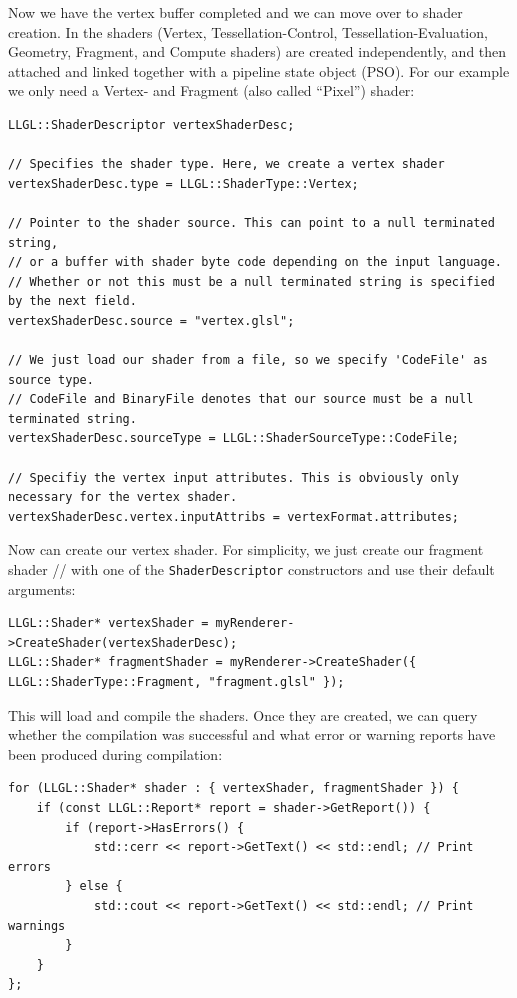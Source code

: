 \documentclass{article}
\begin{document}
Now we have the vertex buffer completed and we can move over to shader creation.
In \LLGL the shaders (Vertex, Tessellation-Control, Tessellation-Evaluation, Geometry, Fragment, and Compute shaders)
are created independently, and then attached and linked together with a pipeline state object (PSO).
For our example we only need a Vertex- and Fragment (also called ``Pixel'') shader:
\begin{lstlisting}
LLGL::ShaderDescriptor vertexShaderDesc;

// Specifies the shader type. Here, we create a vertex shader
vertexShaderDesc.type = LLGL::ShaderType::Vertex;

// Pointer to the shader source. This can point to a null terminated string,
// or a buffer with shader byte code depending on the input language.
// Whether or not this must be a null terminated string is specified by the next field.
vertexShaderDesc.source = "vertex.glsl";

// We just load our shader from a file, so we specify 'CodeFile' as source type.
// CodeFile and BinaryFile denotes that our source must be a null terminated string.
vertexShaderDesc.sourceType	= LLGL::ShaderSourceType::CodeFile;

// Specifiy the vertex input attributes. This is obviously only necessary for the vertex shader.
vertexShaderDesc.vertex.inputAttribs = vertexFormat.attributes;
\end{lstlisting}
Now can create our vertex shader. For simplicity, we just create our fragment shader
// with one of the \texttt{ShaderDescriptor} constructors and use their default arguments:
\begin{lstlisting}
LLGL::Shader* vertexShader = myRenderer->CreateShader(vertexShaderDesc);
LLGL::Shader* fragmentShader = myRenderer->CreateShader({ LLGL::ShaderType::Fragment, "fragment.glsl" });
\end{lstlisting}
This will load and compile the shaders. Once they are created, we can query whether the compilation was successful
and what error or warning reports have been produced during compilation:
\begin{lstlisting}
for (LLGL::Shader* shader : { vertexShader, fragmentShader }) {
    if (const LLGL::Report* report = shader->GetReport()) {
        if (report->HasErrors() {
            std::cerr << report->GetText() << std::endl; // Print errors
        } else {
            std::cout << report->GetText() << std::endl; // Print warnings
        }
    }
};
\end{lstlisting}
\end{document}
